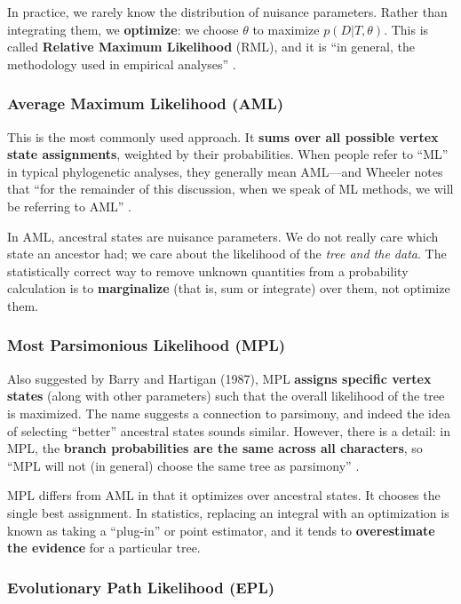 In practice, we rarely know the distribution of nuisance parameters. Rather than integrating them, we \textbf{optimize}: we choose $\theta$ to maximize $p(D|T, \theta)$. This is called \textbf{Relative Maximum Likelihood} (RML), and it is ``in general, the methodology used in empirical analyses'' \parencite{wheeler2012}.

\subsubsection{Average Maximum Likelihood (AML)}

This is the most commonly used approach. It \textbf{sums over all possible vertex state assignments}, weighted by their probabilities. When people refer to ``ML'' in typical phylogenetic analyses, they generally mean AML---and Wheeler notes that ``for the remainder of this discussion, when we speak of ML methods, we will be referring to AML'' \parencite{wheeler2012}.

In AML, ancestral states are nuisance parameters. We do not really care which state an ancestor had; we care about the likelihood of the \textit{tree and the data}. The statistically correct way to remove unknown quantities from a probability calculation is to \textbf{marginalize} (that is, sum or integrate) over them, not optimize them.

\subsubsection{Most Parsimonious Likelihood (MPL)}

Also suggested by Barry and Hartigan (1987), MPL \textbf{assigns specific vertex states} (along with other parameters) such that the overall likelihood of the tree is maximized. The name suggests a connection to parsimony, and indeed the idea of selecting ``better'' ancestral states sounds similar. However, there is a detail: in MPL, the \textbf{branch probabilities are the same across all characters}, so ``MPL will not (in general) choose the same tree as parsimony'' \parencite{wheeler2012}.

MPL differs from AML in that it optimizes over ancestral states. It chooses the single best assignment. In statistics, replacing an integral with an optimization is known as taking a ``plug-in'' or point estimator, and it tends to \textbf{overestimate the evidence} for a particular tree.

\subsubsection{Evolutionary Path Likelihood (EPL)}

